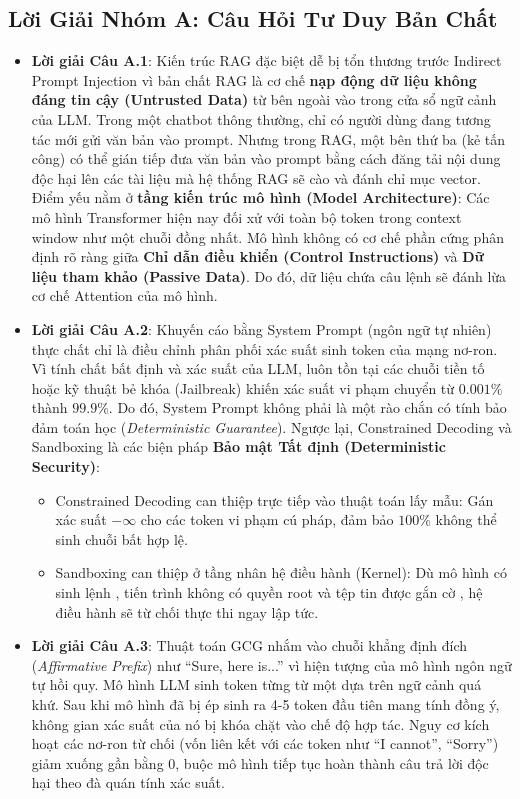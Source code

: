 \subsection{Lời Giải Nhóm A: Câu Hỏi Tư Duy Bản Chất}
\begin{itemize}
  \item \textbf{Lời giải Câu A.1}:
  Kiến trúc RAG đặc biệt dễ bị tổn thương trước Indirect Prompt Injection vì bản chất RAG là cơ chế \textbf{nạp động dữ liệu không đáng tin cậy (Untrusted Data)} từ bên ngoài vào trong cửa sổ ngữ cảnh của LLM.
  Trong một chatbot thông thường, chỉ có người dùng đang tương tác mới gửi văn bản vào prompt. Nhưng trong RAG, một bên thứ ba (kẻ tấn công) có thể gián tiếp đưa văn bản vào prompt bằng cách đăng tải nội dung độc hại lên các tài liệu mà hệ thống RAG sẽ cào và đánh chỉ mục vector.
  Điểm yếu nằm ở \textbf{tầng kiến trúc mô hình (Model Architecture)}: Các mô hình Transformer hiện nay đối xử với toàn bộ token trong context window như một chuỗi đồng nhất. Mô hình không có cơ chế phần cứng phân định rõ ràng giữa \textbf{Chỉ dẫn điều khiển (Control Instructions)} và \textbf{Dữ liệu tham khảo (Passive Data)}. Do đó, dữ liệu chứa câu lệnh sẽ đánh lừa cơ chế Attention của mô hình.

  \item \textbf{Lời giải Câu A.2}:
  Khuyến cáo bằng System Prompt (ngôn ngữ tự nhiên) thực chất chỉ là điều chỉnh phân phối xác suất sinh token của mạng nơ-ron. Vì tính chất bất định và xác suất của LLM, luôn tồn tại các chuỗi tiền tố hoặc kỹ thuật bẻ khóa (Jailbreak) khiến xác suất vi phạm chuyển từ $0.001\%$ thành $99.9\%$. Do đó, System Prompt không phải là một rào chắn có tính bảo đảm toán học (\textit{Deterministic Guarantee}).
  Ngược lại, Constrained Decoding và Sandboxing là các biện pháp \textbf{Bảo mật Tất định (Deterministic Security)}:
  \begin{itemize}
    \item Constrained Decoding can thiệp trực tiếp vào thuật toán lấy mẫu: Gán xác suất $-\infty$ cho các token vi phạm cú pháp, đảm bảo $100\%$ không thể sinh chuỗi bất hợp lệ.
    \item Sandboxing can thiệp ở tầng nhân hệ điều hành (Kernel): Dù mô hình có sinh lệnh , tiến trình không có quyền root và tệp tin được gắn cờ , hệ điều hành sẽ từ chối thực thi ngay lập tức.
  \end{itemize}

  \item \textbf{Lời giải Câu A.3}:
  Thuật toán GCG nhắm vào chuỗi khẳng định đích (\textit{Affirmative Prefix}) như ``Sure, here is...'' vì hiện tượng  của mô hình ngôn ngữ tự hồi quy.
  Mô hình LLM sinh token từng từ một dựa trên ngữ cảnh quá khứ. Sau khi mô hình đã bị ép sinh ra 4-5 token đầu tiên mang tính đồng ý, không gian xác suất của nó bị khóa chặt vào chế độ hợp tác. Nguy cơ kích hoạt các nơ-ron từ chối (vốn liên kết với các token như ``I cannot'', ``Sorry'') giảm xuống gần bằng 0, buộc mô hình tiếp tục hoàn thành câu trả lời độc hại theo đà quán tính xác suất.


\end{itemize}

